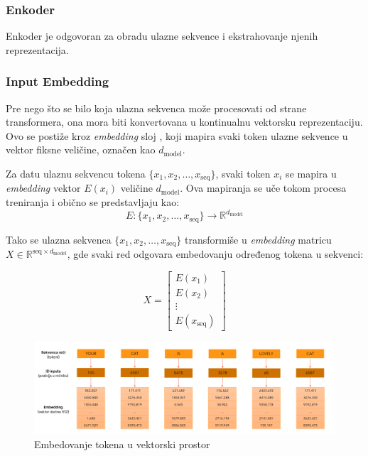 \documentclass[12pt]{article}
\begin{document}
   \subsubsection{Enkoder}
   Enkoder je odgovoran za obradu ulazne sekvence i ekstrahovanje njenih reprezentacija.

   \subsubsection*{Input Embedding}

   Pre nego što se bilo koja ulazna sekvenca može procesovati od strane transformera, 
   ona mora biti konvertovana u kontinualnu vektorsku reprezentaciju. 
   Ovo se postiže kroz \textit{embedding} sloj , 
   koji mapira svaki token ulazne sekvence u vektor fiksne veličine, 
   označen kao \( d_{\text{model}} \).

   \newpage
   Za datu ulaznu sekvencu tokena \(\{x_1, x_2, \dots, x_\text{seq}\}\), 
   svaki token \(x_i\) se mapira u \textit{embedding} vektor \(E(x_i)\) 
   veličine \( d_{\text{model}} \). Ova mapiranja se uče tokom procesa treniranja 
   i obično se predstavljaju kao:
   \[
   E: \{x_1, x_2, \dots, x_\text{seq}\} \rightarrow \mathbb{R}^{d_{\text{model}}}
   \]

   Tako se ulazna sekvenca \(\{x_1, x_2, \dots, x_\text{seq}\}\) transformiše u 
   \textit{embedding} matricu \(X \in \mathbb{R}^{\text{seq} \times d_{\text{model}}}\), gde svaki 
   red odgovara embedovanju određenog tokena u sekvenci:

   \[
   X = \begin{bmatrix}
   E(x_1) \\
   E(x_2) \\
   \vdots \\
   E(x_\text{seq})
   \end{bmatrix}
   \]

   \begin{figure}[h!]
      \hspace{-2cm} %
      \includegraphics[width=1.3\textwidth]{token.png}
      \caption{Embedovanje tokena u vektorski prostor}
      \label{fig:token_embedding}
   \end{figure}
\end{document}
